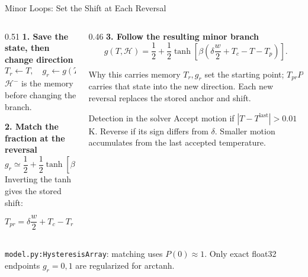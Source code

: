 \documentclass[aspectratio=169]{beamer}
\newcommand{\slidesource}[1]{%
    \vfill
    {\tiny\color{gray}#1}
}
\begin{document}
\begin{frame}{Minor Loops: Set the Shift at Each Reversal}
\begin{columns}[T,onlytextwidth]
\begin{column}{0.51\textwidth}
\footnotesize
\textbf{1. Save the state, then change direction}
\[
T_r\leftarrow T,\quad
g_r\leftarrow g(T,\mathcal H^-),\quad
\delta\leftarrow\operatorname{sign}(T-T^{\mathrm{last}}).
\]
\(\mathcal H^-\) is the memory before changing the branch.

\vspace{0.18cm}
\textbf{2. Match the fraction at the reversal}
\[
g_r\simeq\frac12+\frac12\tanh\!\left[
\beta\left(\delta\frac{w}{2}+T_c-T_r-T_{pr}\right)\right].
\]
Inverting the tanh gives the stored shift:
\[
\boxed{T_{pr}=\delta\frac{w}{2}+T_c-T_r
-\frac{\operatorname{arctanh}(2g_r-1)}{\beta}.}
\]
\end{column}
\begin{column}{0.46\textwidth}
\footnotesize
\textbf{3. Follow the resulting minor branch}
\[
g(T,\mathcal H)=\frac12+\frac12\tanh\!\left[
\beta\left(\delta\frac{w}{2}+T_c-T-T_p\right)\right].
\]
\begin{block}{Why this carries memory}
\footnotesize
\(T_r,g_r\) set the starting point; \(T_{pr}P\) carries that state into the new direction. Each new reversal replaces the stored anchor and shift.
\end{block}
\begin{alertblock}{Detection in the solver}
\footnotesize
Accept motion if \(|T-T^{\mathrm{last}}|>0.01\) K. Reverse if its sign differs from \(\delta\). Smaller motion accumulates from the last accepted temperature.
\end{alertblock}
\end{column}
\end{columns}
\slidesource{\texttt{model.py:HysteresisArray}: matching uses \(P(0)\approx1\). Only exact float32 endpoints \(g_r=0,1\) are regularized for arctanh.}
\end{frame}
\end{document}
